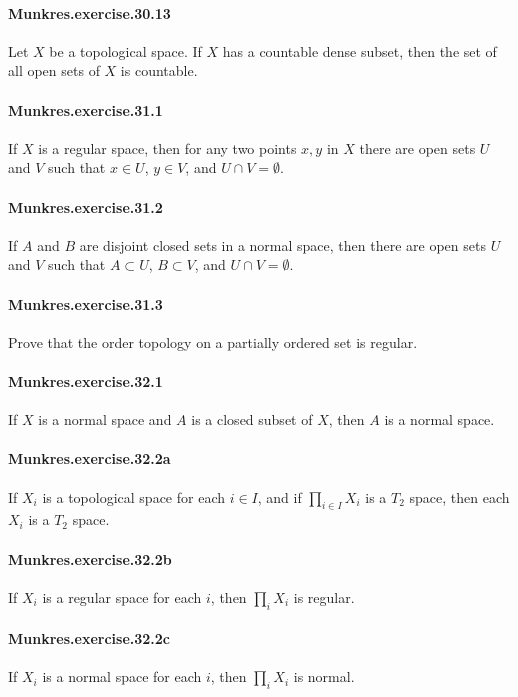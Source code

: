 \documentclass{article}
\begin{document}
\paragraph{Munkres.exercise.30.13} Let $X$ be a topological space. If $X$ has a countable dense subset, then the set of all open sets of $X$ is countable.

\paragraph{Munkres.exercise.31.1} If $X$ is a regular space, then for any two points $x, y$ in $X$ there are open sets $U$ and $V$ such that $x\in U$, $y\in V$, and $U\cap V=\emptyset$.

\paragraph{Munkres.exercise.31.2} If $A$ and $B$ are disjoint closed sets in a normal space, then there are open sets $U$ and $V$ such that $A\subset U$, $B\subset V$, and $U\cap V=\emptyset$.

\paragraph{Munkres.exercise.31.3} Prove that the order topology on a partially ordered set is regular.

\paragraph{Munkres.exercise.32.1} If $X$ is a normal space and $A$ is a closed subset of $X$, then $A$ is a normal space.

\paragraph{Munkres.exercise.32.2a} If $X_i$ is a topological space for each $i\in I$, and if $\prod_{i\in I}X_i$ is a $T_2$ space, then each $X_i$ is a $T_2$ space.

\paragraph{Munkres.exercise.32.2b} If $X_i$ is a regular space for each $i$, then $\prod_i X_i$ is regular.

\paragraph{Munkres.exercise.32.2c} If $X_i$ is a normal space for each $i$, then $\prod_i X_i$ is normal.
\end{document}
